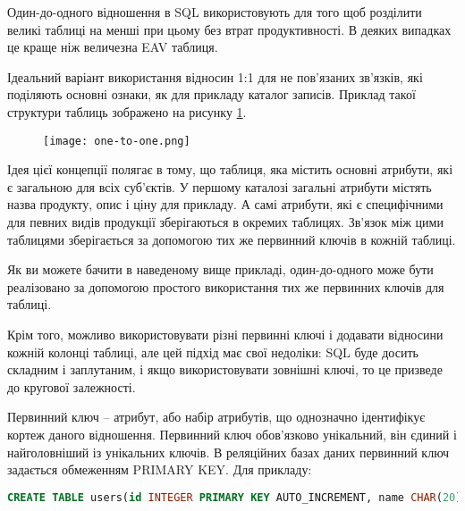 \par Один-до-одного відношення в SQL використовують для того щоб розділити великі таблиці на менші при цьому без втрат продуктивності. В деяких випадках це краще ніж величезна EAV \cite{EAV} таблиця. 
\par Ідеальний варіант використання відносин 1:1 для не пов'язаних зв'язків, які поділяють основні ознаки, як для прикладу каталог записів. Приклад такої структури таблиць зображено на рисунку \ref{pic:one_to_one.png}.
\begin{figure}[!ht]
\centering
		\texttt{[image: one-to-one.png]}
		\label{pic:one_to_one.png}
\end{figure}
\par Ідея цієї концепції полягає в тому, що таблиця, яка містить основні атрибути, які є загальною для всіх суб'єктів. У першому каталозі загальні атрибути містять назва продукту, опис і ціну для прикладу. А самі атрибути, які є специфічними для певних видів продукції зберігаються в окремих таблицях. Зв'язок між цими таблицями зберігається за допомогою тих же первинний ключів в кожній таблиці.
\par Як ви можете бачити в наведеному вище прикладі, один-до-одного може бути реалізовано за допомогою простого використання тих же первинних ключів для таблиці. 
\par Крім того, можливо використовувати різні первинні ключі і додавати відносини кожній колонці таблиці, але цей підхід має свої недоліки: SQL буде досить складним і заплутаним, і якщо використовувати зовнішні ключі, то це призведе до кругової залежності.
\par Первинний ключ -- атрибут, або набір атрибутів, що однозначно ідентифікує кортеж даного відношення. Первинний ключ обов'язково унікальний, він єдиний і найголовніший із унікальних ключів.
В реляційних базах даних первинний ключ задається обмеженням PRIMARY KEY. Для прикладу:
\begin{lstlisting}[language=SQL]
CREATE TABLE users(id INTEGER PRIMARY KEY AUTO_INCREMENT, name CHAR(20), surname CHAR(40));
\end{lstlisting}


